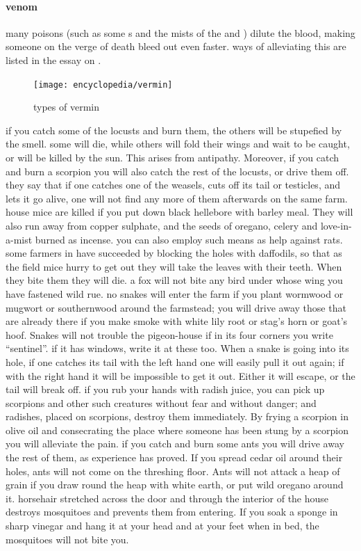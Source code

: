 \paragraph{venom} many poisons (such as some s and the mists of the  and ) dilute the blood, making someone on the verge of death bleed out even faster. ways of alleviating this are listed in the essay on .
\begin{figure}\centering\texttt{[image: encyclopedia/vermin]}\caption{types of vermin}\end{figure}  \localpar {} if you catch some of the locusts and burn them, the others will be stupefied by the smell. some will die, while others will fold their wings and wait to be caught, or will be killed by the sun. This arises from antipathy. Moreover, if you catch and burn a scorpion you will also catch the rest of the locusts, or drive them off. \localpar {} they say that if one catches one of the weasels, cuts off its tail or testicles, and lets it go alive, one will not find any more of them afterwards on the same farm. \localpar {} house mice are killed if you put down black hellebore with barley meal. They will also run away from copper sulphate, and the seeds of oregano, celery and love-in-a-mist burned as incense. you can also employ such means as help against rats. \localpar {} some farmers in  have succeeded by blocking the holes with daffodils, so that as the field mice hurry to get out they will take the leaves with their teeth. When they bite them they will die. \localpar {} a fox will not bite any bird under whose wing you have fastened wild rue. \localpar {} no snakes will enter the farm if you plant wormwood or mugwort or southernwood around the farmstead; you will drive away those that are already there if you make smoke with white lily root or stag’s horn or goat’s hoof. Snakes will not trouble the pigeon-house if in its four corners you write “sentinel”. if it has windows, write it at these too. When a snake is going into its hole, if one catches its tail with the left hand one will easily pull it out again; if with the right hand it will be impossible to get it out. Either it will escape, or the tail will break off. \localpar {} if you rub your hands with radish juice, you can pick up scorpions and other such creatures without fear and without danger; and radishes, placed on scorpions, destroy them immediately. By frying a scorpion in olive oil and consecrating the place where someone has been stung by a scorpion you will alleviate the pain. \localpar {} if you catch and burn some ants you will drive away the rest of them, as experience has proved. If you spread cedar oil around their holes, ants will not come on the threshing floor. Ants will not attack a heap of grain if you draw round the heap with white earth, or put wild oregano around it. \localpar {} horsehair stretched across the door and through the interior of the house destroys mosquitoes and prevents them from entering. If you soak a sponge in sharp vinegar and hang it at your head and at your feet when in bed, the mosquitoes will not bite you. 